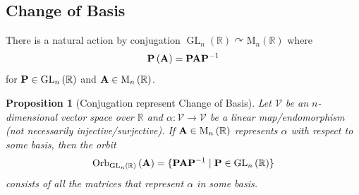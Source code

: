 \documentclass{article}
\newtheorem{proposition}[theorem]{Proposition}
\theoremstyle{definition}
\theoremstyle{remark}
\newcommand{\pqty}[1]{\left(#1\right)}
\newcommand{\set}[2]{\{#1\mid #2\}}
\newcommand{\functiondomain}[3]{#1:#2\to #3}
\newcommand{\inverse}{^{-1}}
\newcommand{\actson}{\curvearrowright}
\newcommand{\RR}{\mathbb{R}}
\newcommand{\GL}{\operatorname{GL}}
\newcommand{\matrixset}{\mathrm{M}}
\newcommand{\Orb}{\operatorname{Orb}}
\begin{document}
\subsection{Change of Basis}
\label{sec:change-of-basis}

There is a natural action by conjugation \(\GL_n\pqty{\RR} \actson \matrixset_n\pqty{\RR}\) where
\[
    \vb{P}\pqty{\vb{A}} = \vb{P} \vb{A} \vb{P}\inverse
\]
for \(\vb{P} \in \GL_n\pqty{\RR}\) and \(\vb{A} \in \matrixset_n\pqty{\RR}\).

\begin{proposition}[Conjugation represent Change of Basis]
    \label{prop:conjugation-change-of-basis}%
    Let \(\mathcal{V}\) be an \(n\)-dimensional vector space over \(\RR\) and \(\functiondomain{\alpha}{\mathcal{V}}{\mathcal{V}}\) be a linear map/endomorphism (not necessarily injective/surjective). If \(\vb{A} \in \matrixset_n\pqty{\RR}\) represents \(\alpha\) with respect to some basis, then the orbit
    \[
        \Orb_{\GL_n\pqty{\RR}} \pqty{\vb{A}} = \set{\vb{P} \vb{A} \vb{P}\inverse}{\vb{P} \in \GL_n\pqty{\RR}}
    \]
    consists of \emph{all} the matrices that represent \(\alpha\) in some basis.
\end{proposition}
\end{document}
